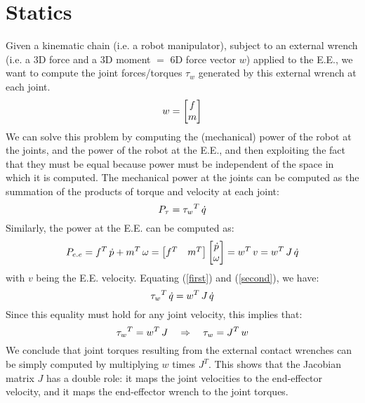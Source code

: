\section{Statics}
                Given a kinematic chain (i.e. a robot manipulator), subject to an external wrench (i.e. a 3D force and a 3D moment $=$ 6D force vector $w$) applied to the E.E., we want to compute the joint forces/torques $\tau_w$ generated by this external wrench at each joint.       
                \begin{equation}
                    w = \begin{bmatrix}
                            f\\
                            m
                        \end{bmatrix}
                \end{equation}
                We can solve this problem by computing the (mechanical) power of the robot at the joints, and the power of the robot at the E.E., and then exploiting the fact that they must be equal because power must be independent of the space in which it is computed.
                The mechanical power at the joints can be computed as the summation of the products of torque and velocity at each joint:
                \begin{equation}{\label{first}}
                    P_\tau = {\tau_{w}}^{T} \, \dot{q}
                \end{equation}
                Similarly, the power at the E.E. can be computed as:
                \begin{equation}{\label{second}}
                     P_{e.e} = f^T \, \dot{p} + m^T \, \omega = \begin{bmatrix}
                         f^T & m^T\\
                     \end{bmatrix}
                     \begin{bmatrix}
                         \dot{p}\\
                         \omega
                     \end{bmatrix} = 
                     w^{T} \, v = w^T \, J \, \dot{q}
                \end{equation}
                with $v$ being the E.E. velocity.
                Equating (\ref{first}) and (\ref{second}), we have:
                \begin{equation}{\label{final}}
                    {\tau_{w}}^{T} \, \dot{q} = w^{T} \, J \, \dot{q}
                \end{equation} 
                Since this equality must hold for any joint velocity, this implies that: 
                \begin{equation}{\label{final_}}
                    {\tau_{w}}^{T} = w^{T} \, J \quad \Rightarrow \quad {\tau_{w}} = J^{T} \, w
                \end{equation}
                We conclude that joint torques resulting from the external contact wrenches can be simply computed by multiplying $w$ times $J^T$.
                This shows that the Jacobian matrix $J$ has a double role: it maps the joint velocities to the end-effector velocity, and it maps the end-effector wrench to the joint torques.
            
